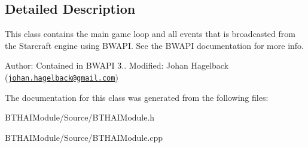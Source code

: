 \subsection{Detailed Description}
This class contains the main game loop and all events that is broadcasted from the Starcraft engine using B\-W\-A\-P\-I. See the B\-W\-A\-P\-I documentation for more info.

Author\-: Contained in B\-W\-A\-P\-I 3.. Modified\-: Johan Hagelback (\href{mailto:johan.hagelback@gmail.com}{\tt johan.\-hagelback@gmail.\-com}) 

The documentation for this class was generated from the following files\-:\begin{DoxyCompactItemize}
\item 
B\-T\-H\-A\-I\-Module/\-Source/B\-T\-H\-A\-I\-Module.\-h\item 
B\-T\-H\-A\-I\-Module/\-Source/B\-T\-H\-A\-I\-Module.\-cpp\end{DoxyCompactItemize}
